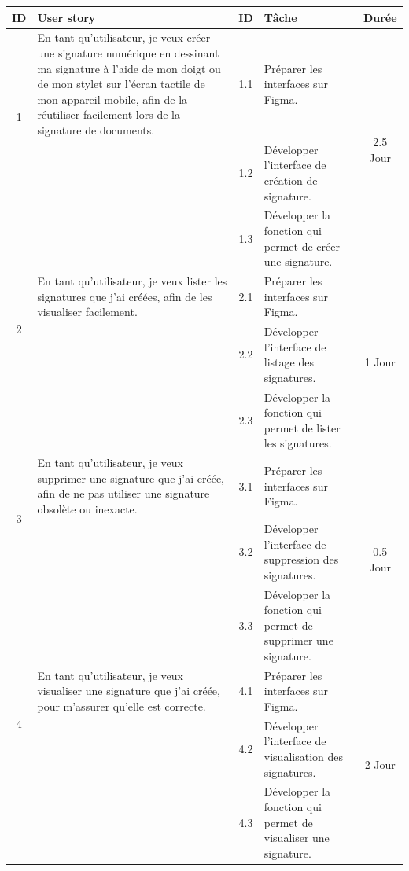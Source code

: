 \begin{adjustwidth}{-1cm}{}
    
    \begin{longtable}{|c|p{6cm}|c|p{6cm}|c|}
      \hline
      \textbf{ID} & \textbf{User story} & \textbf{ID}  & \textbf{Tâche} & \textbf{Durée} \\
      \hline
      \multirow{2}{*}{1} & En tant qu'utilisateur, je veux créer une signature numérique en dessinant ma signature à l'aide de mon doigt ou de mon stylet sur l'écran tactile de mon appareil mobile, afin de la réutiliser facilement lors de la signature de documents. & 1.1 & Préparer les interfaces sur Figma. & \multirow{3}{*}{2.5 Jour} \\
      \cline{3-4}
      & & 1.2 & Développer l'interface de création de signature. & \\
      \cline{3-4}
      & & 1.3 & Développer la fonction qui permet de créer une signature. & \\
      \cline{1-5}
      \multirow{2}{*}{2} & En tant qu'utilisateur, je veux lister les signatures que j'ai créées, afin de les visualiser facilement. & 2.1 & Préparer les interfaces sur Figma. & \multirow{3}{*}{1 Jour} \\
      \cline{3-4}
      & & 2.2 & Développer l'interface de listage des signatures. & \\
      \cline{3-4}
      & & 2.3 & Développer la fonction qui permet de lister les signatures. & \\
      \cline{1-5}
      \multirow{2}{*}{3} & En tant qu'utilisateur, je veux supprimer une signature que j'ai créée, afin de ne pas utiliser une signature
      obsolète ou inexacte. & 3.1 & Préparer les interfaces sur Figma. & \multirow{3}{*}{0.5 Jour} \\
      \cline{3-4}
      & & 3.2 & Développer l'interface de suppression des signatures. & \\
      \cline{3-4}
      & & 3.3 & Développer la fonction qui permet de supprimer une signature. & \\
      \cline{1-5}
      \multirow{2}{*}{4} & En tant qu'utilisateur, je veux visualiser une signature que j'ai créée, pour m'assurer qu'elle est correcte. & 4.1 & Préparer les interfaces sur Figma. & \multirow{3}{*}{2 Jour} \\
      \cline{3-4}
      & & 4.2 & Développer l'interface de visualisation des signatures. & \\
      \cline{3-4}
      & & 4.3 & Développer la fonction qui permet de visualiser une signature. & \\

\end{longtable}
\end{adjustwidth}
